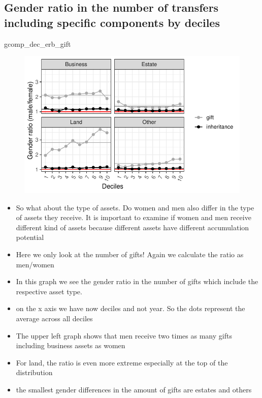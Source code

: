 \documentclass[
  letterpaper,
  DIV=11,
  numbers=noendperiod]{scrartcl}
\newenvironment{Shaded}{\begin{snugshade}}{\end{snugshade}}
\newcommand{\NormalTok}[1]{\textcolor[rgb]{0.00,0.23,0.31}{#1}}
\providecommand{\tightlist}{%
  \setlength{\itemsep}{0pt}\setlength{\parskip}{0pt}}\usepackage{longtable,booktabs,array}
\begin{document}
\hypertarget{gender-ratio-in-the-number-of-transfers-including-specific-components-by-deciles}{%
\subsection{Gender ratio in the number of transfers including specific
components by
deciles}\label{gender-ratio-in-the-number-of-transfers-including-specific-components-by-deciles}}

\begin{Shaded}
\begin{Highlighting}[]
\NormalTok{gcomp\_dec\_erb\_gift}
\end{Highlighting}
\end{Shaded}

\begin{figure}[H]

{\centering \includegraphics{dgs_files/figure-pdf/unnamed-chunk-3-1.pdf}

}

\end{figure}

\begin{itemize}
\tightlist
\item
  So what about the type of assets. Do women and men also differ in the
  type of assets they receive. It is important to examine if women and
  men receive different kind of assets because different assets have
  different accumulation potential
\item
  Here we only look at the number of gifts! Again we calculate the ratio
  as men/women
\item
  In this graph we see the gender ratio in the number of gifts which
  include the respective asset type.
\item
  on the x axis we have now deciles and not year. So the dots represent
  the average across all deciles
\item
  The upper left graph shows that men receive two times as many gifts
  including business assets as women
\item
  For land, the ratio is even more extreme especially at the top of the
  distribution
\item
  the smallest gender differences in the amount of gifts are estates and
  others
\end{itemize}
\end{document}
